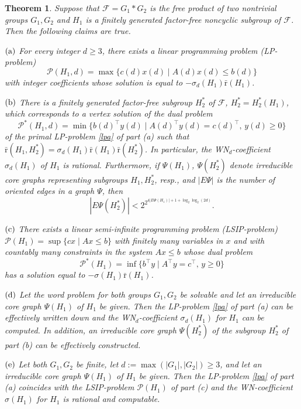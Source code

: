 \documentclass[10pt, reqno]{amsart}
\numberwithin{equation}{section}
\newtheorem{thm}{Theorem}[section]
\begin{document}
\begin{thm}\label{th1} Suppose that ${\mathcal{F}} =G_1 * G_2$ is the free product of two nontrivial groups $G_1,  G_2$
and  $H_1$ is a  finitely generated factor-free noncyclic subgroup of ${\mathcal{F}}$. Then the following claims are true.

$\rm{(a)}$ For every integer $d \ge 3$,  there exists a linear programming problem (LP-problem)
\begin{equation}\label{lpa}
{\mathcal{P}}(H_1, d) = \max\{ c(d)x(d) \mid A(d)x(d) \le b(d)  \}
\end{equation}
with integer coefficients whose solution is equal to $-\sigma_d(H_1) {\bar {\mathrm{r}}} (H_1)$.

$\rm{(b)}$  There is a finitely generated factor-free subgroup $H_2^* $ of ${\mathcal{F}}$, $H_2^*= H_2^*(H_1)$,   which corresponds to  a vertex solution of the dual problem
$$
{\mathcal{P}}^*(H_1, d) = \min \{ b(d)^{\top}  y(d)  \mid A(d)^{\top}y(d) = c(d)^{\top} , \, y(d) \ge 0  \}
$$
of the primal LP-problem  \eqref{lpa} of part (a) such that   $\bar {\mathrm{r}}(H_1, H_2^*)  =  \sigma_d(H_1)  \bar {\mathrm{r}}(H_1) \bar {\mathrm{r}}( H_2^*)$. In particular,  the WN${}_d$-coefficient $\sigma_d(H_1)$ of $H_1$ is rational. Furthermore, if $\Psi(H_1)$, $\Psi(H_2^*)$ denote irreducible core graphs representing subgroups $H_1, H_2^*$, resp.,
and $| E \Psi |$ is the number of oriented edges in a graph $\Psi$, then
$$
| E  \Psi(H_2^*) | < 2^{  2^{4| E  \Psi(H_1) | + 1+ \log_2 \log_2 (2d)  } } .
$$

$\rm{(c)}$ There exists a linear semi-infinite programming problem (LSIP-problem) ${\mathcal{P}}(H_1) = \sup \{ cx \mid Ax \le b  \}$ with finitely many variables in $x$ and with countably  many constraints in the system $Ax \le b$ whose dual problem
$$
{\mathcal{P}}^*(H_1)  = \inf \{ b^{\top} y \mid A^{\top} y = c^{\top} , \, y \ge 0  \}
$$
has a solution equal to  $-\sigma(H_1) {\bar {\mathrm{r}}} (H_1)$.

$\rm{(d)}$ Let the word problem for both groups $G_1, G_2$ be solvable
and let an  irreducible core graph $\Psi(H_1)$  of $H_1$ be given. Then the
LP-problem \eqref{lpa}  of part (a)   can be effectively written down and the
WN${}_d$-coefficient $\sigma_d(H_1)$ for $H_1$  can be computed.
In addition,  an irreducible core graph $\Psi(H_2^*)$ of the subgroup $H_2^*$ of part (b) can be effectively constructed.

$\rm{(e)}$ Let both $G_1, G_2$ be finite,  let $d := \max( |G_1|, |G_2|) \ge 3$, and
 let an irreducible  core graph $\Psi(H_1)$  of $H_1$ be given.
 Then the LP-problem \eqref{lpa} of part (a)  coincides with the
LSIP-problem ${\mathcal{P}}(H_1)$ of part (c) and the WN-coefficient $\sigma(H_1)$ for $H_1$ is
rational and computable.
 \end{thm}
\end{document}
